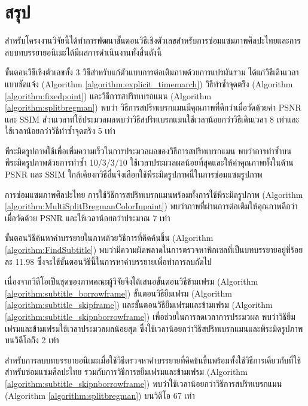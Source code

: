 \chapter{สรุป}

\hspace{1cm}สำหรับโครงงานวิจัยนี้ได้ทำการพัฒนาขั้นตอนวิธีเชิงตัวเลขสำหรับการซ่อมแซมภาพศิลปะไทยและการลบบทบรรยายอนิเมะได้มีผลการดำเนินงานทั้งสิ้นดังนี้

\hspace{1cm} ขั้นตอนวิธีเชิงตัวเลขทั้ง 3  วิธีสำหรับแก้ตัวแบบการต่อเติมภาพด้วยการแปรผันรวม ได้แก่วิธีเดินเวลาแบบชัดแจ้ง (Algorithm \ref{algorithm:explicit_timemarch}) วิธีทำซ้ำจุดตรึง (Algorithm \ref{algorithm:fixedpoint}) และวิธีการสปริทเบรกแมน (Algorithm \ref{algorithm:splitbregman}) พบว่า วิธีการสปริทเบรกแมนมีคุณภาพที่ดีกว่าเมื่อวัดด้วยค่า PSNR และ SSIM ส่วนเวลาท่ใช้ประมวลผลพบว่าวิธีสปริทเบรกแมนใช้เวลาน้อยกว่าวิธีเดินเวลา 8 เท่าและใช้เวลาน้อยกว่าวิธีทำซ้ำจุดตรึง 5 เท่า

\hspace{1cm} พีระมิดรูปภาพใช้เพื่อเพิ่มความเร็วในการประมวลผลของวิธีการสปริทเบรกแมน พบว่าการทำซ้ำบนพีระมิดรูปภาพด้วยการทำซ้ำ 10/3/3/10 ใช้เวลาประมวลผลน้อยที่สุดและให้ค่าคุณภาพทั้งในด้าน PSNR และ SSIM ใกล้เคียงกวิธีอื่นจึงเลือกใช้พีระมิดรูปภาพนี้ในการซ่อมแซมรูปภาพ

\hspace{1cm} การซ่อมแซมภาพศิลปะไทย การใช้วิธีการสปริทเบรกแมนพร้อมทั้งการใช้พีระมิดรูปภาพ (Algorithm \ref{algorithm:MultiSplitBregmanColorInpaint}) พบว่าภาพที่ผ่านการต่อเติมให้คุณภาพดีกว่าเมื่อวัดด้วย PSNR และใช้เวลาน้อยกว่าประมาณ 7 เท่า

\hspace{1cm} ขั้นตอนวิธีค้นหาคำบรรยายในภาพด้วยวิธีการที่คิดค้นขึ้น (Algorithm \ref{algorithm:FindSubtitle}) พบว่ามีความผิดพลาดในการตรวจหาพิกเซลที่เป็นบทบรรยายอยู่ที่ร้อยละ 11.98 ซึ่งจะใช้ขั้นตอนวิธีนี้ในการหาคำบรรยายเพื่อทำการลบถัดไป

\hspace{1cm} เนื่องจากวิดีโอเป็นชุดของภาพคณะผู้วิจัยจึงได้เสนอขั้นตอนวิธีข้ามเฟรม (Algorithm \ref{algorithm:subtitle_borrowframe})  ขั้นตอนวิธียืมเฟรม (Algorithm \ref{algorithm:subtitle_skipframe}) และขั้นตอนวิธียืมเฟรมและข้ามเฟรม (Algorithm \ref{algorithm:subtitle_skipnborrowframe}) เพื่อช่วยในการลดเวลาการประมวผล พบว่าวิธียืมเฟรมและข้ามเฟรมใช้เวลาประมวลผลน้อยสุด ซึ่งใช้เวลาน้อยกว่าวิธีสปริทเบรกแมนและพีระมิดรูปภาพบนวิดีโอถึง 2 เท่า

\hspace{1cm} สำหรับการลบบทบรรยายอนิเมะเมื่อใช้วิธีตรวจหาคำบรรยายที่คิดข้นขึ้นพร้อมทั้งใช้วิธีการเดียวกับที่ใช้สำหรับซ่อมแซมศิลปะไทย รวมกับการวิธีการขยืมเฟรมและข้ามเฟรม (Algorithm \ref{algorithm:subtitle_skipnborrowframe}) พบว่าใช้เวลาน้อยกว่าวิธีการสปริทเบรกแมน (Algorithm \ref{algorithm:splitbregman}) บนวิดีโอ 67 เท่า

\clearpage